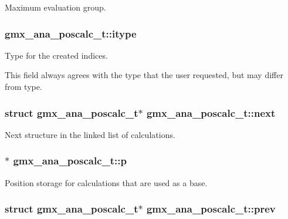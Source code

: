\-Maximum evaluation group. 

\hypertarget{structgmx__ana__poscalc__t_a210bc2a0c9e2fc5d60b020ea2e46e66b}{
\subsubsection[{itype}]{ {\bf gmx\-\_\-ana\-\_\-poscalc\-\_\-t\-::itype}}}\label{structgmx__ana__poscalc__t_a210bc2a0c9e2fc5d60b020ea2e46e66b}


\-Type for the created indices. 

\-This field always agrees with the type that the user requested, but may differ from {\ttfamily type}. \hypertarget{structgmx__ana__poscalc__t_a7361a5bb17a15c573e5b5986583761af}{
\subsubsection[{next}]{\setlength{\rightskip}{0pt plus 5cm}struct {\bf gmx\-\_\-ana\-\_\-poscalc\-\_\-t}$\ast$ {\bf gmx\-\_\-ana\-\_\-poscalc\-\_\-t\-::next}}}\label{structgmx__ana__poscalc__t_a7361a5bb17a15c573e5b5986583761af}
\-Next structure in the linked list of calculations. \hypertarget{structgmx__ana__poscalc__t_af8e621e3296236f51d768438758b7cfe}{
\subsubsection[{p}]{$\ast$ {\bf gmx\-\_\-ana\-\_\-poscalc\-\_\-t\-::p}}}\label{structgmx__ana__poscalc__t_af8e621e3296236f51d768438758b7cfe}
\-Position storage for calculations that are used as a base. \hypertarget{structgmx__ana__poscalc__t_a573eeaa2a637cb914a06734a9db4d656}{
\subsubsection[{prev}]{\setlength{\rightskip}{0pt plus 5cm}struct {\bf gmx\-\_\-ana\-\_\-poscalc\-\_\-t}$\ast$ {\bf gmx\-\_\-ana\-\_\-poscalc\-\_\-t\-::prev}}}\label{structgmx__ana__poscalc__t_a573eeaa2a637cb914a06734a9db4d656}
